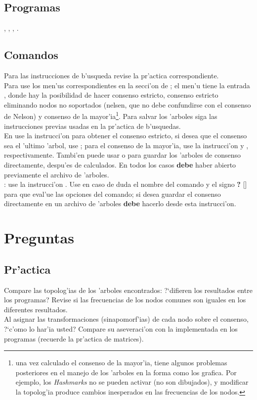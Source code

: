 \subsection{Programas}
\noindent
{}, , , .
\subsection{Comandos}
Para las instrucciones de b'usqueda revise la pr'actica correspondiente.\\
Para   use los men'us correspondientes en la secci'on de ; el men'u  tiene la entrada , donde hay la posibilidad de hacer consenso estricto, consenso estricto eliminando nodos no soportados (nelsen, que no debe confundirse con el consenso de Nelson) y consenso de la mayor'ia\footnote{una vez calculado el consenso de la mayor'ia,  tiene algunos problemas posteriores en el manejo de los 'arboles en la forma como los grafica. Por ejemplo, los \textit{Hashmarks} no se pueden activar (no son dibujados), y modificar la topolog'ia produce cambios inesperados en las frecuencias de los nodos.}. Para salvar los 'arboles siga las instrucciones previas usadas en la pr'actica de b'usquedas.\\
En  use la instrucci'on  para obtener el consenso estricto, si desea que el consenso sea el 'ultimo 'arbol, use ; para el consenso de la mayor'ia, use la instrucci'on  y , respectivamente. Tambi'en puede usar   o    para guardar los 'arboles de consenso directamente, despu'es de calculados. En todos los casos \textbf{debe} haber abierto previamente el archivo de 'arboles.\\
: use la instrucci'on . Use en caso de duda el nombre del comando y el signo \textbf{?} [] para que eval'ue las opciones del comando; si desea guardar el consenso directamente en un archivo de 'arboles \textbf{debe} hacerlo desde esta instrucci'on.
\section{Preguntas}
\subsection{Pr'actica}
\noindent
Compare las topolog'ias de los 'arboles encontrados: ?`difieren los resultados entre los programas? Revise si las frecuencias de los nodos comunes son iguales en los diferentes resultados.\\
Al asignar las transformaciones (sinapomorf'ias) de cada nodo sobre el consenso, ?`c'omo lo har'ia usted? Compare su aseveraci'on con la implementada en los programas (recuerde la pr'actica de matrices).
